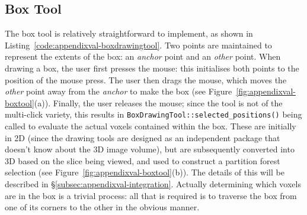 \subsection{Box Tool}


The box tool is relatively straightforward to implement, as shown in Listing~\ref{code:appendixval-boxdrawingtool}. Two points are maintained to represent the extents of the box: an \emph{anchor} point and an \emph{other} point. When drawing a box, the user first presses the mouse: this initialises both points to the position of the mouse press. The user then drags the mouse, which moves the \emph{other} point away from the \emph{anchor} to make the box (see Figure~\ref{fig:appendixval-boxtool}(a)). Finally, the user releases the mouse; since the tool is not of the multi-click variety, this results in \texttt{BoxDrawingTool::selected_positions()} being called to evaluate the actual voxels contained within the box. These are initially in 2D (since the drawing tools are designed as an independent package that doesn't know about the 3D image volume), but are subsequently converted into 3D based on the slice being viewed, and used to construct a partition forest selection (see Figure~\ref{fig:appendixval-boxtool}(b)). The details of this will be described in \S\ref{subsec:appendixval-integration}. Actually determining which voxels are in the box is a trivial process: all that is required is to traverse the box from one of its corners to the other in the obvious manner.

